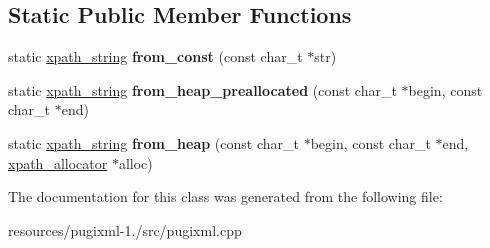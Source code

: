 \subsection*{Static Public Member Functions}
\begin{DoxyCompactItemize}
\item 
\hypertarget{classxpath__string_a6dce01c6b3a949c3c4c886e6be44931e}{static \hyperlink{classxpath__string}{xpath\+\_\+string} {\bfseries from\+\_\+const} (const char\+\_\+t $\ast$str)}\label{classxpath__string_a6dce01c6b3a949c3c4c886e6be44931e}

\item 
\hypertarget{classxpath__string_a37e13c2dc384cac842cee3870e9e9e23}{static \hyperlink{classxpath__string}{xpath\+\_\+string} {\bfseries from\+\_\+heap\+\_\+preallocated} (const char\+\_\+t $\ast$begin, const char\+\_\+t $\ast$end)}\label{classxpath__string_a37e13c2dc384cac842cee3870e9e9e23}

\item 
\hypertarget{classxpath__string_aaf1229b7a7ae918b41bf995df16c8896}{static \hyperlink{classxpath__string}{xpath\+\_\+string} {\bfseries from\+\_\+heap} (const char\+\_\+t $\ast$begin, const char\+\_\+t $\ast$end, \hyperlink{classxpath__allocator}{xpath\+\_\+allocator} $\ast$alloc)}\label{classxpath__string_aaf1229b7a7ae918b41bf995df16c8896}

\end{DoxyCompactItemize}


The documentation for this class was generated from the following file\+:\begin{DoxyCompactItemize}
\item 
resources/pugixml-\/1./src/pugixml.\+cpp\end{DoxyCompactItemize}
